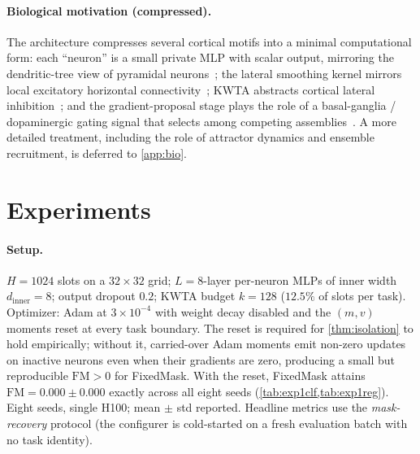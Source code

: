 \documentclass{article}
\theoremstyle{plain}
\theoremstyle{remark}
\begin{document}
\paragraph{Biological motivation (compressed).}
The architecture compresses several cortical motifs into a minimal computational form: each ``neuron'' is a small private MLP with scalar output, mirroring the dendritic-tree view of pyramidal neurons~\citep{poirazi2003pyramidal,beniaguev2021single}; the lateral smoothing kernel mirrors local excitatory horizontal connectivity~\citep{hubel1962receptive,gilbert1983clustered,douglas2004neuronal}; KWTA abstracts cortical lateral inhibition~\citep{maass2000computational,amari1977dynamics}; and the gradient-proposal stage plays the role of a basal-ganglia / dopaminergic gating signal that selects among competing assemblies~\citep{mink1996basal,schultz1997neural,oreilly2006making}. A more detailed treatment, including the role of attractor dynamics and ensemble recruitment, is deferred to \cref{app:bio}.

\section{Experiments}
\label{sec:experiments}

\paragraph{Setup.}
\label{sec:setup}
$H{=}1024$ slots on a $32\times 32$ grid; $L{=}8$-layer per-neuron MLPs of inner width $d_\mathrm{inner}{=}8$; output dropout $0.2$; KWTA budget $k{=}128$ ($12.5\%$ of slots per task). Optimizer: Adam at $3\times 10^{-4}$ with weight decay disabled and the $(m,v)$ moments reset at every task boundary. The reset is required for \cref{thm:isolation} to hold empirically; without it, carried-over Adam moments emit non-zero updates on inactive neurons even when their gradients are zero, producing a small but reproducible $\mathrm{FM}>0$ for FixedMask. With the reset, FixedMask attains $\mathrm{FM}=0.000\pm 0.000$ exactly across all eight seeds (\cref{tab:exp1clf,tab:exp1reg}). Eight seeds, single H100; mean $\pm$ std reported. Headline metrics use the \emph{mask-recovery} protocol (the configurer is cold-started on a fresh evaluation batch with no task identity).
\end{document}
